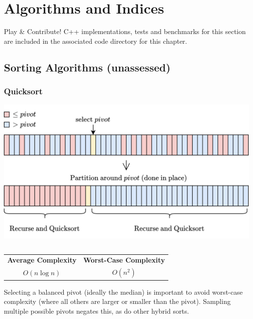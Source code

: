 \chapter{Algorithms and Indices}
\begin{sidenotebox}{Play \& Contribute!}
    C++ implementations, tests and benchmarks for this section are included in the associated code directory for this chapter.
\end{sidenotebox}

\section{Sorting Algorithms (unassessed)}

\subsection{Quicksort}
\begin{center}
    \includegraphics[width=.8\textwidth]{algorithms_and_indices/images/quicksort.drawio.png}
\end{center}
\inputminted{cpp}{algorithms_and_indices/code/sort_comparison/sorts/quicksort.h}
\begin{center}
    \begin{tabular}{c | c}
        \textbf{Average Complexity} & \textbf{Worst-Case Complexity} \\
        $O(n \log n)$               & $O(n^2)$                       \\
    \end{tabular}
\end{center}
Selecting a balanced pivot (ideally the median) is important to avoid worst-case complexity (where all others are larger or smaller than the pivot). Sampling multiple possible pivots negates this, as do other hybrid sorts.

